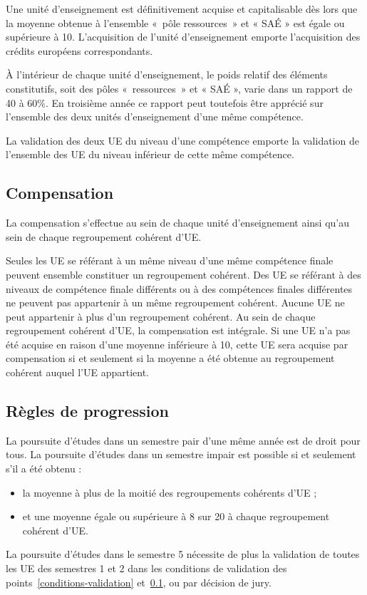 \documentclass[10pt]{article}
\begin{document}
Une unité d'enseignement est définitivement acquise et capitalisable dès
lors que la moyenne obtenue à l'ensemble «~pôle ressources~» et « SAÉ »
est égale ou supérieure à 10. L'acquisition de l'unité d'enseignement
emporte l'acquisition des crédits européens correspondants.

À l'intérieur de chaque unité d'enseignement, le poids relatif des
éléments constitutifs, soit des pôles «~ressources~» et « SAÉ », varie
dans un rapport de 40 à 60\%. En troisième année ce rapport peut
toutefois être apprécié sur l'ensemble des deux unités d'enseignement
d'une même compétence.

La validation des deux UE du niveau d'une compétence emporte la
validation de l'ensemble des UE du niveau inférieur de cette même
compétence.

\subsection{Compensation}\label{compensation}
La compensation s'effectue au sein de chaque unité d'enseignement ainsi
qu'au sein de chaque regroupement cohérent d'UE.

Seules les UE se référant à un même niveau d'une même compétence finale
peuvent ensemble constituer un regroupement cohérent. Des UE se référant
à des niveaux de compétence finale différents ou à des compétences
finales différentes ne peuvent pas appartenir à un même regroupement
cohérent. Aucune UE ne peut appartenir à plus d'un regroupement
cohérent.  Au sein de chaque regroupement cohérent d'UE, la compensation
est intégrale. Si une UE n'a pas été acquise en raison d'une moyenne
inférieure à 10, cette UE sera acquise par compensation si et seulement
si la moyenne a été obtenue au regroupement cohérent auquel l'UE
appartient.

\subsection{Règles de progression}
La poursuite d'études dans un semestre pair d'une même année est de
droit pour tous. La poursuite d'études dans un semestre impair
est possible si et seulement s'il a été obtenu :
\begin{itemize}
\item la moyenne à plus de la moitié des regroupements cohérents d'UE ;
\item et une moyenne égale ou supérieure à 8 sur 20 à chaque
  regroupement cohérent d'UE.
\end{itemize}
La poursuite d'études dans le semestre 5 nécessite de plus la validation
de toutes les UE des semestres 1 et 2 dans les conditions de validation
des points~\ref{conditions-validation} et~\ref{compensation}, ou par
décision de jury.
\end{document}
